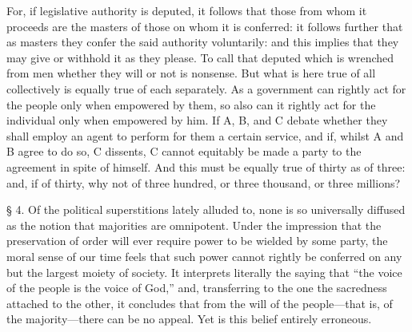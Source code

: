 \documentclass[oneside]{book}
\begin{document}
For, if legislative authority is deputed, it follows that those
from whom it proceeds are the masters of those on whom it is
conferred: it follows further that as masters they confer the said
authority voluntarily: and this implies that they may give or
withhold it as they please. To call that deputed which is
wrenched from men whether they will or not is nonsense. But
what is here true of all collectively is equally true of each
separately. As a government can rightly act for the people only
when empowered by them, so also can it rightly act for the
individual only when empowered by him. If A, B, and C
debate whether they shall employ an agent to perform for them
a certain service, and if, whilst A and B agree to do so, C
dissents, C cannot equitably be made a party to the agreement in
spite of himself. And this must be equally true of thirty as of
three: and, if of thirty, why not of three hundred, or three
thousand, or three millions?
\newpage


\S{} 4. Of the political superstitions lately alluded to, none
is so universally diffused as the notion that majorities are
omnipotent. Under the impression that the preservation of
order will ever require power to be wielded by some party, the
moral sense of our time feels that such power cannot rightly be
conferred on any but the largest moiety of society. It interprets
literally the saying that ``the voice of the people is the voice of
God,'' and, transferring to the one the sacredness attached to the
other, it concludes that from the will of the people---that is, of
the majority---there can be no appeal. Yet is this belief entirely
erroneous.

\vspace{\baselineskip}
\end{document}
